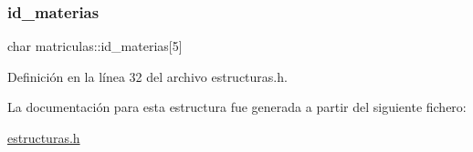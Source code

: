 \subsubsection{\texorpdfstring{id\+\_\+materias}{id\_materias}}
{\footnotesize\ttfamily char matriculas\+::id\+\_\+materias\mbox{[}5\mbox{]}}



Definición en la línea 32 del archivo estructuras.\+h.



La documentación para esta estructura fue generada a partir del siguiente fichero\+:\begin{DoxyCompactItemize}
\item 
\mbox{\hyperlink{estructuras_8h}{estructuras.\+h}}\end{DoxyCompactItemize}
